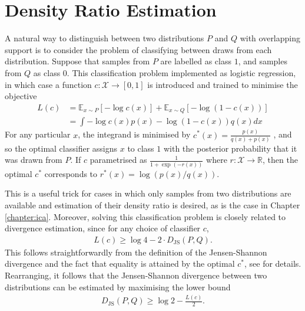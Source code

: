 



\section{Density Ratio Estimation}\label{sec:literature-density-ratio-estimation}

A natural way to distinguish between two distributions $P$ and $Q$ with overlapping support is to consider the problem of classifying between draws from each distribution.
Suppose that samples from $P$ are labelled as class $1$, and samples from $Q$ as class $0$. 
This classification problem implemented as logistic regression, in which case a function $c:\mathcal{X}\to [0,1]$ is introduced and trained to minimise the objective 
%
\begin{align*}
L(c) &=  \mathbb{E}_{x\sim P}\left[ - \log c(x) \right] + \mathbb{E}_{x \sim Q} \left[ - \log(1 - c(x)) \right] \\
&= \int -\log c(x) p(x) - \log (1 - c(x)) q(x) dx
\end{align*}
%
For any particular $x$, the integrand is minimised by $c^*(x) = \frac{p(x)}{q(x) + p(x)}$ \citep{goodfellow2014generative}, and so the optimal classifier assigns $x$ to class $1$ with the posterior probability that it was drawn from $P$.
If $c$ parametrised as $\frac{1}{1+\exp( -r(x))}$ where $r:\mathcal{X}\to\mathbb{R}$, then the optimal  $c^*$ corresponds to $r^*(x) = \log\left(p(x) / q(x)\right)$.

This is a useful trick for cases in which only samples from two distributions are available and estimation of their density ratio is desired, as is the case in Chapter \ref{chapter:ica}.
Moreover, solving this classification problem is closely related to divergence estimation, since for any choice of classifier $c$,
%
\begin{align*}
L(c) \geq \log 4 - 2 \cdot D_{\text{JS}}(P, Q).
\end{align*}
%
This follows straightforwardly from the definition of the Jensen-Shannon divergence and the fact that equality is attained by the optimal $c^*$, see \cite{goodfellow2014generative} for details.
Rearranging, it follows that the Jensen-Shannon divergence between two distributions can be estimated by maximising the lower bound
%
\begin{align*}
D_{\text{JS}}(P, Q) \geq \log 2 - \frac{L(c)}{2}.
\end{align*}

